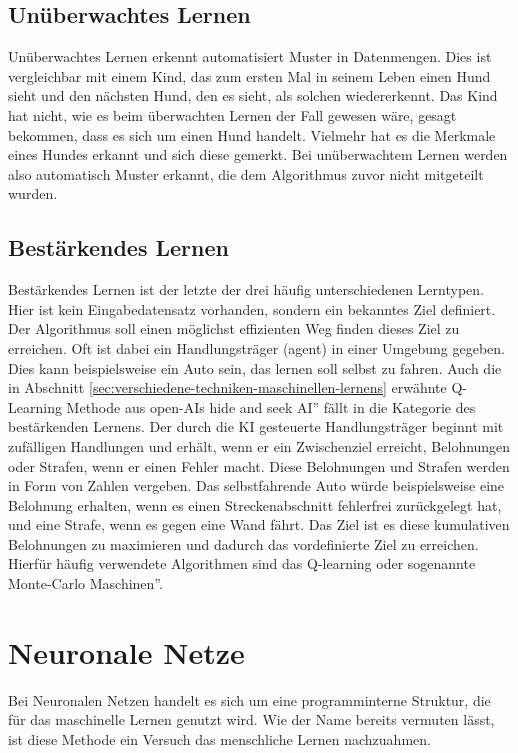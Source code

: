 \documentclass[11pt]{article}
\begin{document}
\subsection{Unüberwachtes Lernen}
Unüberwachtes Lernen erkennt automatisiert Muster in Datenmengen. Dies ist vergleichbar mit einem Kind, das zum ersten Mal in seinem Leben einen Hund sieht und den nächsten Hund, den es sieht, als solchen wiedererkennt. Das Kind hat nicht, wie es beim überwachten Lernen der Fall gewesen wäre, gesagt bekommen, dass es sich um einen Hund handelt. Vielmehr hat es die Merkmale eines Hundes erkannt und sich diese gemerkt.
Bei unüberwachtem Lernen werden also automatisch Muster erkannt, die dem Algorithmus zuvor nicht mitgeteilt wurden. 
\subsection{Bestärkendes Lernen}
Bestärkendes Lernen ist der letzte der drei häufig unterschiedenen Lerntypen. Hier ist kein Eingabedatensatz vorhanden, sondern ein bekanntes Ziel definiert. Der Algorithmus soll einen möglichst effizienten Weg finden dieses Ziel zu erreichen. Oft ist dabei ein Handlungsträger (agent) in einer Umgebung gegeben. Dies kann beispielsweise ein Auto sein, das lernen soll selbst zu fahren. Auch die in Abschnitt  \ref{sec:verschiedene-techniken-maschinellen-lernens} erwähnte Q-Learning Methode aus open-AIs \glqq hide and seek AI'' fällt in die Kategorie des bestärkenden Lernens. Der durch die KI gesteuerte Handlungsträger beginnt mit zufälligen Handlungen und erhält, wenn er ein Zwischenziel erreicht, Belohnungen oder Strafen, wenn er einen Fehler macht. Diese Belohnungen und Strafen werden in Form von Zahlen vergeben. Das selbstfahrende Auto würde beispielsweise eine Belohnung erhalten, wenn es einen Streckenabschnitt fehlerfrei zurückgelegt hat, und eine Strafe, wenn es gegen eine Wand fährt. Das Ziel ist es diese kumulativen Belohnungen zu maximieren und dadurch das vordefinierte Ziel zu erreichen. Hierfür häufig verwendete Algorithmen sind das Q-learning oder sogenannte \glqq Monte-Carlo Maschinen''.
\section{Neuronale Netze}\label{sec:neuronale-netze}
Bei Neuronalen Netzen handelt es sich um eine programminterne Struktur, die für das maschinelle Lernen genutzt wird. Wie der Name bereits vermuten lässt, ist diese Methode ein Versuch das menschliche Lernen nachzuahmen.
\end{document}
